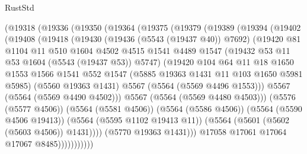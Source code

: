 \begin{lexlean}{RustStd}
\begin{coremodule}
            (@19318
              (@19336
                (@19350
                  (@19364
                    (@19375
                      (@19379
                        (@19389
                          (@19394
                            (@19402
                              (@19408
                                (@19418
                                  (@19430
                                    (@19436 (@5543 (@19437 @40)) @7692)
                                    (@19420
                                      @81
                                      @1104
                                      @11
                                      @510
                                      @1604
                                      @4502
                                      @4515
                                      @1541
                                      @4489
                                      @1547
                                      (@19432 @53 @11 @53 @1604 (@5543 (@19437 @53)) @5747)
                                      (@19420
                                        @104
                                        @64
                                        @11
                                        @18
                                        @1650
                                        @1553
                                        @1566
                                        @1541
                                        @552
                                        @1547
                                        (@5885 @19363 @1431 @11 @103 @1650 @5981 @5985)
                                        (@5560 @19363 @1431)
                                        @5567
                                        (@5564 (@5569 @4496 @1553)))
                                      @5567
                                      (@5564 (@5569 @4490 @4502)))
                                    @5567
                                    (@5564 (@5569 @4480 @4503)))
                                  (@5576 (@5577 @4506))
                                  (@5564 (@5581 @4506))
                                  (@5564 (@5586 @4506))
                                  (@5564 (@5590 @4506 @19413))
                                  (@5564 (@5595 @1102 @19413 @11))
                                  (@5564 (@5601 (@5602 (@5603 @4506)) @1431))))
                              (@5770 @19363 @1431)))
                          @17058
                          @17061
                          @17064
                          @17067
                          @8485)))))))))))

\end{coremodule}
\end{lexlean}
